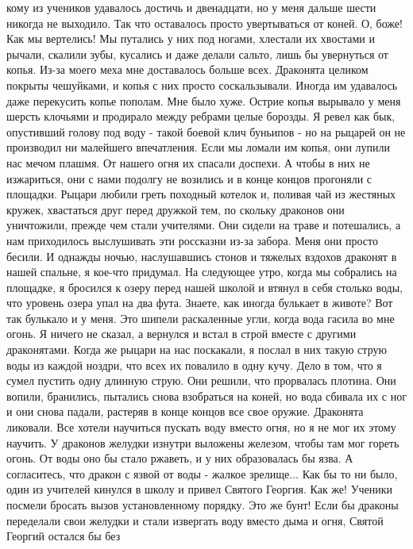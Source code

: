 кому из учеников удавалось достичь и двенадцати, но у меня дальше 
шести никогда не выходило. Так что оставалось просто увертываться от 
коней. О, боже! Как мы вертелись! Мы путались у них под ногами, 
хлестали их хвостами и рычали, скалили зубы, кусались и даже делали 
сальто, лишь бы увернуться от копья. Из-за моего меха мне доставалось 
больше всех. Драконята целиком покрыты чешуйками, и копья с них просто 
соскальзывали. Иногда им удавалось даже перекусить копье пополам. Мне 
было хуже. Острие копья вырывало у меня шерсть клочьями и продирало 
между ребрами целые борозды. Я ревел как бык, опустивший голову под 
воду - такой боевой клич буньипов - но на рыцарей он не производил ни 
малейшего впечатления.
    Если мы ломали им копья, они лупили нас мечом плашмя. От нашего 
огня их спасали доспехи. А чтобы в них не изжариться, они с нами 
подолгу не возились и в конце концов прогоняли с площадки.
    Рыцари любили греть походный котелок и, поливая чай из жестяных 
кружек, хвастаться друг перед дружкой тем, по скольку драконов они 
уничтожили, прежде чем стали учителями. Они сидели на траве и 
потешались, а нам приходилось выслушивать эти россказни из-за забора.
    Меня они просто бесили. И однажды ночью, наслушавшись стонов и 
тяжелых вздохов драконят в нашей спальне, я кое-что придумал. На 
следующее утро, когда мы собрались на площадке, я бросился к озеру 
перед нашей школой и втянул в себя столько воды, что уровень озера 
упал на два фута. Знаете, как иногда булькает в животе? Вот так 
булькало и у меня. Это шипели раскаленные угли, когда вода гасила во 
мне огонь. Я ничего не сказал, а вернулся и встал в строй вместе с 
другими драконятами. Когда же рыцари на нас поскакали, я послал в них 
такую струю воды из каждой ноздри, что всех их повалило в одну кучу. 
Дело в том, что я сумел пустить одну длинную струю. Они решили, что 
прорвалась плотина. Они вопили, бранились, пытались снова взобраться 
на коней, но вода сбивала их с ног и они снова падали, растеряв в 
конце концов все свое оружие.
    Драконята ликовали. Все хотели научиться пускать воду вместо огня, 
но я не мог их этому научить. У драконов желудки изнутри выложены 
железом, чтобы там мог гореть огонь. От воды оно бы стало ржаветь, и у 
них образовалась бы язва. А согласитесь, что дракон с язвой от воды - 
жалкое зрелище...
    Как бы то ни было, один из учителей кинулся в школу и привел 
Святого Георгия. Как же! Ученики посмели бросать вызов установленному 
порядку. Это же бунт! Если бы драконы переделали свои желудки и стали 
извергать воду вместо дыма и огня, Святой Георгий остался бы без 
